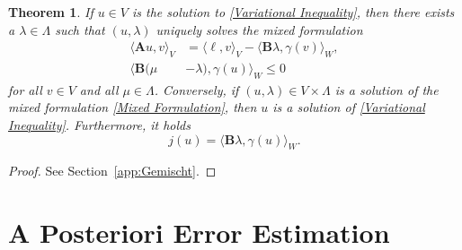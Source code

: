 \documentclass[12pt,twoside,reqno]{amsart}
\newtheorem{theorem}{Theorem}[section]
\theoremstyle{definition}
\numberwithin{equation}{section}
\newcommand{\B} {\bm{B}}
\begin{document}
%
    \begin{theorem}\label{Existenz Gemischte Formulierung}
        If $u\in V$ is the solution to \eqref{Variational Inequality}, then there exists a ${\lambda}\in\Lambda$ such that $(u,{\lambda})$ uniquely solves the mixed formulation
        \begin{subequations}\label{Mixed Formulation}
            \begin{align}
                \langle \bm{A}u,v\rangle_V &= \langle \bm{\ell}, v\rangle_V - \langle\B \lambda,\gamma(v)\rangle_W,\label{Mixed Formulation Gleichung}\\
                \langle \B(\mu&-\lambda),\gamma(u)\rangle_W \leq 0\label{Mixed Formulation Ungleichung}
            \end{align}
        \end{subequations}
        for all $v\in V$ and all $\mu\in \Lambda$.
        Conversely, if $(u,{\lambda})\in V\times \Lambda$ is a solution of the mixed formulation \eqref{Mixed Formulation}, then $u$ is a solution of \eqref{Variational Inequality}.
        Furthermore, it holds 
        \begin{equation}\label{eq: conditions on lambda and gamma u}
                j(u)= \langle \B \lambda,\gamma(u)\rangle_W.
        \end{equation}
    \end{theorem}
    \begin{proof}
        See Section~\ref{app:Gemischt}. 
    \end{proof}


\section{A Posteriori Error Estimation}\label{sec: A Posteriori}
\end{document}
